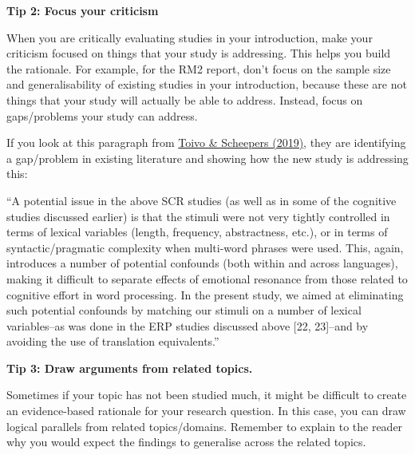\documentclass[
  english,
  letterpaper,
  DIV=11,
  numbers=noendperiod]{scrreprt}
\begin{document}
\textbf{Tip 2: Focus your criticism}

When you are critically evaluating studies in your introduction, make
your criticism focused on things that your study is addressing. This
helps you build the rationale. For example, for the RM2 report, don't
focus on the sample size and generalisability of existing studies in
your introduction, because these are not things that your study will
actually be able to address. Instead, focus on gaps/problems your study
can address.

If you look at this paragraph from
\href{https://journals.plos.org/plosone/article?id=10.1371/journal.pone.0210450}{Toivo
\& Scheepers (2019)}, they are identifying a gap/problem in existing
literature and showing how the new study is addressing this:

\begin{tcolorbox}[enhanced jigsaw, breakable, bottomtitle=1mm, leftrule=.75mm, opacityback=0, colbacktitle=quarto-callout-note-color!10!white, opacitybacktitle=0.6, toprule=.15mm, colback=white, left=2mm, coltitle=black, bottomrule=.15mm, titlerule=0mm, title={Focusing cricitism}, toptitle=1mm, colframe=quarto-callout-note-color-frame, arc=.35mm, rightrule=.15mm]

``A potential issue in the above SCR studies (as well as in some of the
cognitive studies discussed earlier) is that the stimuli were not very
tightly controlled in terms of lexical variables (length, frequency,
abstractness, etc.), or in terms of syntactic/pragmatic complexity when
multi-word phrases were used. This, again, introduces a number of
potential confounds (both within and across languages), making it
difficult to separate effects of emotional resonance from those related
to cognitive effort in word processing. In the present study, we aimed
at eliminating such potential confounds by matching our stimuli on a
number of lexical variables--as was done in the ERP studies discussed
above {[}22, 23{]}--and by avoiding the use of translation
equivalents.''

\end{tcolorbox}

\textbf{Tip 3: Draw arguments from related topics. }

Sometimes if your topic has not been studied much, it might be difficult
to create an evidence-based rationale for your research question. In
this case, you can draw logical parallels from related topics/domains.
Remember to explain to the reader why you would expect the findings to
generalise across the related topics.
\end{document}
